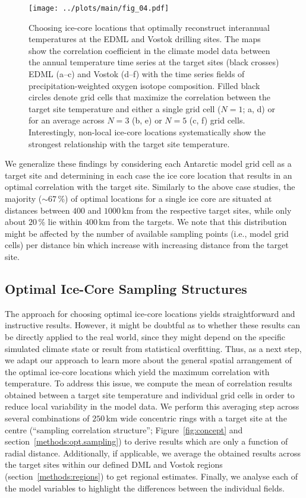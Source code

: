 \documentclass[draft]{agujournal2019}
\begin{document}
\begin{figure*}[t]%
\centering
\texttt{[image: ../plots/main/fig\_04.pdf]}
\caption[Picking optimal sites]{%
  Choosing ice-core locations that optimally reconstruct interannual
  temperatures at the EDML and Vostok drilling sites. The maps show the
  correlation coefficient in the climate model data between the annual
  temperature time series at the target sites (black crosses) EDML (a--c) and
  Vostok (d--f) with the time series fields of precipitation-weighted oxygen
  isotope composition. Filled black circles denote grid cells that maximize the
  correlation between the target site temperature and either a single grid cell
  ($N=1$; a, d) or for an average across $N=3$ (b, e) or $N=5$ (c, f) grid
  cells. Interestingly, non-local ice-core locations systematically show the
  strongest relationship with the target site temperature.}
\label{fig:picking}%
\end{figure*}%

We generalize these findings by considering each Antarctic model grid cell as a
target site and determining in each case the ice core location that results in
an optimal correlation with the target site. Similarly to the above case
studies, the majority ($\sim67$\,\%) of optimal locations for a single ice core
are situated at distances between $400$ and $1000$\,km from the respective
target sites, while only about $20$\,\% lie within $400$\,km from the
targets. We note that this distribution might be affected by the number of
available sampling points (i.e., model grid cells) per distance bin which
increase with increasing distance from the target site.

\subsection{Optimal Ice-Core Sampling Structures}
\label{results:optim-spacing}

The approach for choosing optimal ice-core locations yields straightforward and
instructive results. However, it might be doubtful as to whether these results
can be directly applied to the real world, since they might depend on the
specific simulated climate state or result from statistical overfitting. Thus,
as a next step, we adapt our approach to learn more about the general spatial
arrangement of the optimal ice-core locations which yield the maximum
correlation with temperature. To address this issue, we compute the mean of
correlation results obtained between a target site temperature and individual
grid cells in order to reduce local variability in the model data. We perform
this averaging step across several combinations of $250$\,km wide concentric
rings with a target site at the centre (``sampling correlation structure'';
Figure~\ref{fig:concept} and section~\ref{methods:opt.sampling}) to derive
results which are only a function of radial distance. Additionally, if
applicable, we average the obtained results across the target sites within our
defined DML and Vostok regions (section~\ref{methods:regions}) to get regional
estimates. Finally, we analyse each of the model variables to highlight the
differences between the individual fields.
\end{document}
